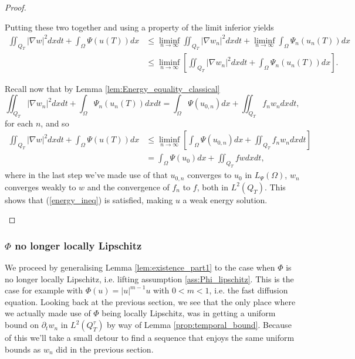 \documentclass[11pt, a4paper]{article}
\begin{document}
\begin{proof}
\begin{description}
	Putting these two together and using a property of the limit inferior yields
	\begin{align*}
	\iint_{Q_T}|\nabla w|^2dxdt + \int_\Omega \Psi(u(T))dx &\leq \liminf_{n \to \infty} \iint_{Q_T} |\nabla w_n|^2 dxdt + \liminf_{n \to \infty} \int_\Omega \Psi_n(u_n(T))dx \\
	&\leq \liminf_{n \to \infty} \left[ \iint_{Q_T} |\nabla w_n|^2 dxdt + \int_\Omega \Psi_n(u_n(T))dx \right].
	\end{align*}
	
	Recall now that by Lemma \ref{lem:Energy_equality_classical} 
	\begin{equation*}
	\iint_{Q_T} |\nabla w_n|^2 dxdt + \int_\Omega \Psi_n(u_n(T))dxdt = \int_\Omega \Psi(u_{0,n})dx + \iint_{Q_T}f_n w_n dxdt,
	\end{equation*}
	for each $n$, and so
	\begin{align*}
	\iint_{Q_T}|\nabla w|^2dxdt + \int_\Omega \Psi(u(T))dx &\leq \liminf_{n \to \infty} \left[\int_\Omega \Psi(u_{0,n})dx + \iint_{Q_T}f_n w_n dxdt \right] \\
	&= \int_\Omega \Psi(u_0)dx + \iint_{Q_T} f w dxdt,
	\end{align*}
	where in the last step we've made use of that $u_{0,n}$ converges to $u_0$ in $L_{\Psi}(\Omega)$, $w_n$ converges weakly to $w$ and the convergence of $f_n$ to $f$, both in $L^2(Q_T)$. This shows that (\ref{energy_ineq}) is satisfied, making $u$ a weak energy solution.
\end{description}

\end{proof}



\subsubsection{$\Phi$ no longer locally Lipschitz}
We proceed by generalising Lemma \ref{lem:existence_part1} to the case when $\Phi$ is no longer locally Lipschitz, i.e. lifting assumption \ref{ass:Phi_lipschitz}. This is the case for example with $\Phi(u) = |u|^{m-1}u$ with $0< m < 1$, i.e. the fast diffusion equation.
Looking back at the previous section, we see that the only place where we actually made use of $\Phi$ being locally Lipschitz, was in getting a uniform bound on $\partial_t w_n$ in $L^2(Q_T^\tau)$ by way of Lemma \ref{prop:temporal_bound}. Because of this we'll take a small detour to find a sequence that enjoys the same uniform bounds as $w_n$ did in the previous section.
\end{document}
